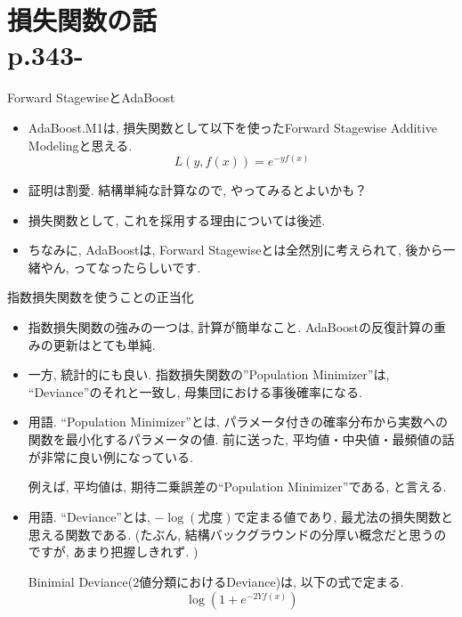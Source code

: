 \documentclass[dvipdfmx,8pt]{beamer}
\begin{document}
  \section{損失関数の話\\p.343-}
  \begin{frame}{Forward StagewiseとAdaBoost}
    \begin{itemize}
      \item AdaBoost.M1は, 損失関数として以下を使ったForward Stagewise Additive Modelingと思える.
        \[
          L(y,f(x))=e^{-yf(x)}
          \]
      \item 証明は割愛. 結構単純な計算なので, やってみるとよいかも？
      \item 損失関数として, これを採用する理由については後述.
      \item ちなみに, AdaBoostは, Forward Stagewiseとは全然別に考えられて, 後から一緒やん, ってなったらしいです.
    \end{itemize}
  \end{frame}
  \begin{frame}{指数損失関数を使うことの正当化}
    \begin{itemize}
      \item 指数損失関数の強みの一つは, 計算が簡単なこと. AdaBoostの反復計算の重みの更新はとても単純.
      \item 一方, 統計的にも良い. 指数損失関数の''Population Minimizer''は, ``Deviance''のそれと一致し, 母集団における事後確率になる.
      \item 用語. ``Population Minimizer''とは, パラメータ付きの確率分布から実数への関数を最小化するパラメータの値. 前に送った, 平均値・中央値・最頻値の話が非常に良い例になっている.

      例えば, 平均値は, 期待二乗誤差の``Population Minimizer''である, と言える.
      \item 用語. ``Deviance''とは, $-\log(\mbox{尤度})$で定まる値であり, 最尤法の損失関数と思える関数である. (たぶん, 結構バックグラウンドの分厚い概念だと思うのですが, あまり把握しきれず. )

      Binimial Deviance(2値分類におけるDeviance)は, 以下の式で定まる.
      \[
        \log \left ( 1+e^{-2Yf(x)} \right )
      \]
    \end{itemize}
  \end{frame}
\end{document}
